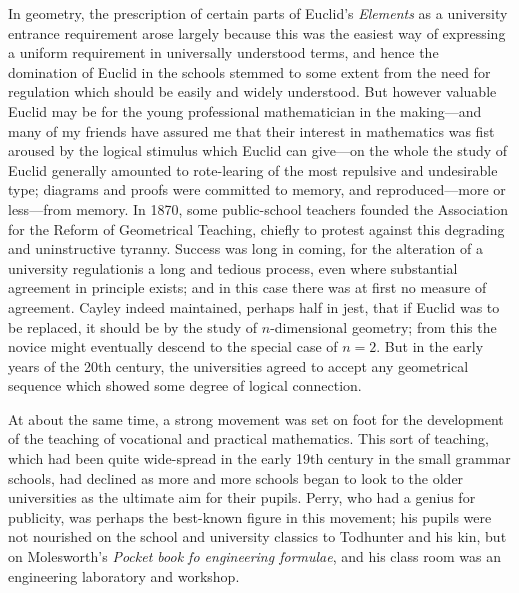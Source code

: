 In geometry, the prescription of certain parts of Euclid's {\em Elements} as a university entrance requirement arose largely because this was the easiest way of expressing a uniform requirement in universally understood terms, and hence the domination of Euclid in the schools stemmed to some extent from the need for regulation which should be easily and widely understood. But however valuable Euclid may be for the young professional mathematician in the making---and many of my friends have assured me that their interest in mathematics was fist aroused by the logical stimulus which Euclid can give---on the whole the study of Euclid generally amounted to rote-learing of the most repulsive and undesirable type; diagrams and proofs were committed to memory, and reproduced---more or less---from memory. In 1870, some public-school teachers founded the Association for the Reform of Geometrical Teaching, chiefly to protest against this degrading and uninstructive tyranny. Success was long in coming, for the alteration of a university regulation\pageoriginale is a long and tedious process, even where substantial agreement in principle exists; and in this case there was at first no measure of agreement. Cayley indeed maintained, perhaps half in jest, that if Euclid was to be replaced, it should be by the study of $n$-dimensional geometry; from this the novice might eventually descend to the special case of $n=2$. But in the early years of the 20th century, the universities agreed to accept any geometrical sequence which showed some degree of logical connection.

At about the same time, a strong movement was set on foot for the development of the teaching of vocational and practical mathematics. This sort of teaching, which had been quite wide-spread in the early 19th century in the small grammar schools, had declined as more and more schools began to look to the older universities as the ultimate aim for their pupils. Perry, who had a genius for publicity, was perhaps the best-known figure in this movement; his pupils were not nourished on the school and university classics to Todhunter and his kin, but on Molesworth's {\em Pocket book fo engineering formulae}, and his class room was an engineering laboratory and workshop.

